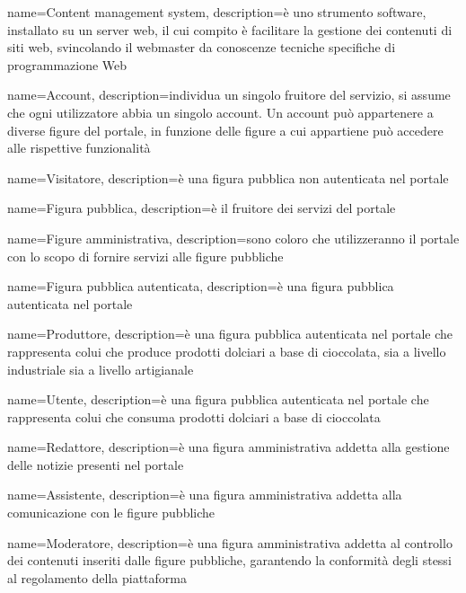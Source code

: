 
{
    name={Content management system},
    description={è uno strumento software, installato su un server web, il cui
        compito è facilitare la gestione dei contenuti di siti web, svincolando il
        webmaster da conoscenze tecniche specifiche di programmazione Web}
}


{
    name={Account},
    description={individua un singolo fruitore del servizio, si assume che ogni utilizzatore abbia un singolo account. Un account può appartenere a diverse figure del portale, in funzione delle figure a cui appartiene può accedere alle rispettive funzionalità}
}

{
    name={Visitatore},
    description={è una figura pubblica non autenticata nel portale}
}

{
    name={Figura pubblica},
    description={è il fruitore dei servizi del portale}
}

{
    name={Figure amministrativa},
    description={sono coloro che utilizzeranno il portale con lo scopo di fornire servizi alle figure pubbliche}
}

{
    name={Figura pubblica autenticata},
    description={è una figura pubblica autenticata nel portale}
}

{
    name={Produttore},
    description={è una figura pubblica autenticata nel portale che rappresenta colui che produce prodotti dolciari a base di cioccolata, sia a livello industriale sia a livello artigianale}
}

{
    name={Utente},
    description={è una figura pubblica autenticata nel portale che rappresenta colui che consuma prodotti dolciari a base di cioccolata}
}

{
    name={Redattore},
    description={è una figura amministrativa addetta alla gestione delle notizie presenti nel portale}
}

{
    name={Assistente},
    description={è una figura amministrativa addetta alla comunicazione con le figure pubbliche}
}

{
    name={Moderatore},
    description={è una figura amministrativa addetta al controllo dei contenuti inseriti dalle figure pubbliche, garantendo la conformità degli stessi al regolamento della piattaforma}
}

